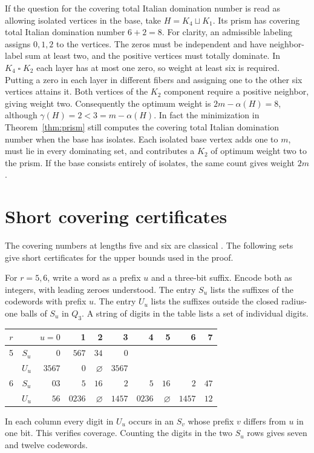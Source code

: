 \documentclass[11pt,a4paper]{article}
\newcommand{\boxprod}{\mathbin{\square}}
\begin{document}
If the question for the covering total Italian domination number is read
as allowing isolated vertices in the base, take $H=K_4\sqcup K_1$.
Its prism has covering total Italian domination number $6+2=8$.
For clarity, an admissible labeling assigns $0,1,2$ to the vertices.
The zeros must be independent and have neighbor-label sum at least two,
and the positive vertices must totally dominate. In $K_4\boxprod K_2$
each layer has at most one zero, so weight at least six is required.
Putting a zero in each layer in different fibers and assigning one to
the other six vertices attains it. Both vertices of the $K_2$ component
require a positive neighbor, giving weight two. Consequently the optimum weight is
$2m-\alpha(H)=8$, although
$\gamma(H)=2<3=m-\alpha(H)$. In fact the minimization in
Theorem~\ref{thm:prism} still computes the covering total Italian
domination number when the base has isolates. Each isolated base vertex
adds one to $m$, must lie in every dominating set, and contributes a
$K_2$ of optimum weight two to the prism. If the base consists entirely of
isolates, the same count gives weight $2m$.

\section*{Short covering certificates}

The covering numbers at lengths five and six are classical
\cite{cls,kazemi26}. The following sets give short certificates for the
upper bounds used in the proof.

For $r=5,6$, write a word as a prefix $u$ and a three-bit suffix. Encode
both as integers, with leading zeroes understood. The entry $S_u$ lists
the suffixes of the codewords with prefix $u$. The entry $U_u$ lists the
suffixes outside the closed radius-one balls of $S_u$ in $Q_3$. A string of
digits in the table lists a set of individual digits.
\begin{center}
\begin{tabular}{cc@{\qquad}rrrrrrrr}
\toprule
$r$ && $u=0$ & 1 & 2 & 3 & 4 & 5 & 6 & 7\\
\midrule
5 & $S_u$ & $0$ & $567$  & $34$ & $0$ \\
  & $U_u$ & $3567$ & $0$ & $\varnothing$ & $3567$ \\
\midrule
6 & $S_u$ & $03$ & $5$ & $16$ & $2$ & $5$ & $16$ & $2$ & $47$ \\
  & $U_u$ & $56$ & $0236$ & $\varnothing$ & $1457$ &
                  $0236$ & $\varnothing$ & $1457$ & $12$ \\
\bottomrule
\end{tabular}
\end{center}
In each column every digit in $U_u$ occurs in an $S_v$ whose prefix
$v$ differs from $u$ in one bit. This verifies coverage. Counting the
digits in the two $S_u$ rows gives seven and twelve codewords.
\end{document}
